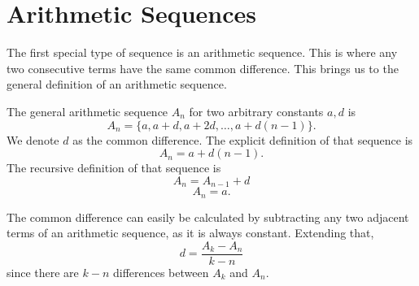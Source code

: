 \section{Arithmetic Sequences}
The first special type of sequence is an arithmetic sequence. This is where any two consecutive terms have the same common difference. This brings us to the general definition of an arithmetic sequence.
\begin{definition}
    The general arithmetic sequence $A_n$ for two arbitrary constants $a, d$ is 
    \[A_n=\{a, a+d, a+2d, \dots, a+d(n-1)\}.\]
    We denote $d$ as the common difference.
    The explicit definition of that sequence is
    \[A_n=a+d(n-1).\]
    The recursive definition of that sequence is
    \[A_n=A_{n-1}+d\]
    \[A_n=a.\]
\end{definition}
The common difference can easily be calculated by subtracting any two adjacent terms of an arithmetic sequence, as it is always constant. 
Extending that, 
\[d=\frac{A_k-A_n}{k-n}\]
since there are $k-n$ differences between $A_k$ and $A_n$.
